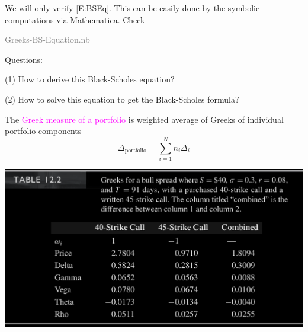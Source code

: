 \begin{frame}[fragile,t]
\begin{myproof}
	We will only verify \eqref{E:BSEq}. This can be easily done by the symbolic computations via
	Mathematica. Check
	\begin{center}
		\textcolor{gray}{Greeks-BS-Equation.nb}
	\end{center}
	\myEnd
\end{myproof}
\end{frame}
\begin{frame}[fragile,t]
\begin{center}
	Questions:\\
	\pause
	\bigskip

	(1) How to derive this Black-Scholes equation?\\
	\pause
	\bigskip

	(2) How to solve this equation to get the Black-Scholes formula?
\end{center}
\end{frame}
\begin{frame}[fragile]
	The \textcolor{magenta}{Greek measure of a portfolio} is weighted average of Greeks of individual portfolio components
	\begin{equation*}
		\Delta_{\text{portfolio}} =\sum_{i=1}^{N} n_i \Delta_i
	\end{equation*}
	\vfill
	\begin{center}
		\includegraphics[scale=0.23]{figs/Table-12-2.png}
	\end{center}
\end{frame}

